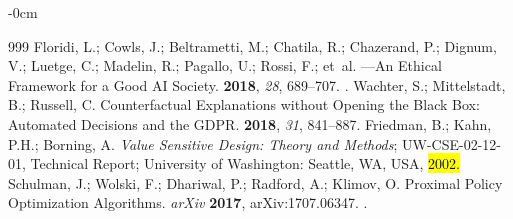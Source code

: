 \documentclass[mca,article,accept,pdftex,oneauthor]{Definitions/mdpi}
\begin{document}
\begin{adjustwidth}{-\extralength}{0cm}
\begin{thebibliography}{999}
Floridi, L.; Cowls, J.; Beltrametti, M.; Chatila, R.; Chazerand, P.; Dignum,
  V.; Luetge, C.; Madelin, R.; Pagallo, U.; Rossi, F.; et~al.
---An Ethical Framework for a Good {AI} Society.
 {\bf 2018}, {\em 28}, 689--707.
.
Wachter, S.; Mittelstadt, B.; Russell, C.
\newblock Counterfactual Explanations without Opening the Black Box: Automated
  Decisions and the {GDPR}.
 {\bf 2018}, {\em 31}, 841--887.
\newblock {} %
Friedman, B.; Kahn, P.H.; Borning, A.
\newblock \emph{Value Sensitive Design: Theory and Methods};
\newblock UW-CSE-02-12-01, Technical Report; University of Washington: Seattle, WA, USA, \hl{2002.} %
Schulman, J.; Wolski, F.; Dhariwal, P.; Radford, A.; Klimov, O.
\newblock Proximal Policy Optimization Algorithms.
\newblock \emph{arXiv} \textbf{2017}, arXiv:1707.06347.
.

\end{thebibliography}




%



\end{adjustwidth}
\end{document}
